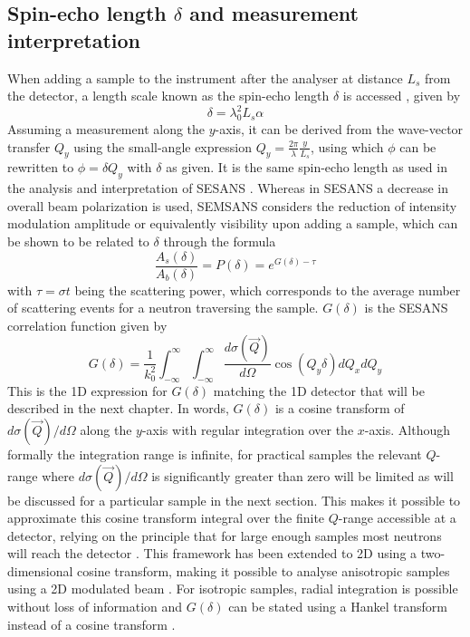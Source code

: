 \documentclass{article}
\begin{document}
\subsection{Spin-echo length $\delta$ and measurement interpretation}
\label{c2.3}
When adding a sample to the instrument after the analyser at distance $L_s$ from the detector, a length scale known as the spin-echo length $\delta$ is accessed \cite{bouwman2011}, given by 
\begin{equation}
	\delta = \lambda_0^2L_s\alpha \label{eq:delta}
\end{equation}
Assuming a measurement along the $y$-axis, it can be derived from the wave-vector transfer $Q_y$ using the small-angle expression $Q_y = \frac{2\pi}{\lambda}\frac{y}{L_s}$, using which $\phi$ can be rewritten to $\phi = \delta Q_y$ with $\delta$ as given. It is the same spin-echo length as used in the analysis and interpretation of SESANS \cite{rekveldt1996}\cite{krouglov2003}\cite{andersson2008}. Whereas in SESANS a decrease in overall beam polarization is used, SEMSANS considers the reduction of intensity modulation amplitude or equivalently visibility upon adding a sample, which can be shown to be related to $\delta$ through the formula \cite{parnell2023}
\begin{equation}
	\frac{A_s(\delta)}{A_b(\delta)} = P(\delta) = e^{G(\delta) - \tau} \label{eq:sample-pol-reduction}
\end{equation}
with $\tau = \sigma t$ being the scattering power, which corresponds to the average number of scattering events for a neutron traversing the sample. $G(\delta)$ is the SESANS correlation function given by
\begin{equation}
	G(\delta) = \frac{1}{k_0^2}\int_{-\infty}^\infty\int_{-\infty}^\infty\dfrac{d\sigma(\vec{Q})}{d\Omega}\cos(Q_y \delta)dQ_xdQ_y  \label{eq:G-analytical}
\end{equation}
This is the 1D expression for $G(\delta)$ matching the 1D detector that will be described in the next chapter. In words, $G(\delta)$ is a cosine transform of $d\sigma(\vec{Q})/d\Omega$ \cite{li2019} along the $y$-axis with regular integration over the $x$-axis. Although formally the integration range is infinite, for practical samples the relevant $Q$-range where $d\sigma(\vec{Q})/d\Omega$ is significantly greater than zero will be limited as will be discussed for a particular sample in the next section. This makes it possible to approximate this cosine transform integral over the finite $Q$-range accessible at a detector, relying on the principle that for large enough samples most neutrons will reach the detector \cite{rekveldt1996}. This framework has been extended to 2D using a two-dimensional cosine transform, making it possible to analyse anisotropic samples using a 2D modulated beam \cite{parnell2023}.
For isotropic samples, radial integration is possible without loss of information and $G(\delta)$ can be stated using a Hankel transform instead of a cosine transform \cite{andersson2008}.
\end{document}
